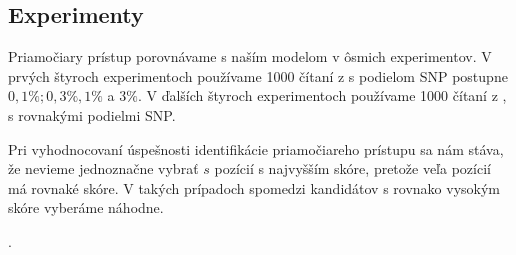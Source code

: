 \subsection{Experimenty}

Priamočiary prístup porovnávame s naším modelom v ôsmich experimentov. V prvých štyroch experimentoch
používame 1000 čítaní z  s podielom SNP postupne $0,1\%; 0,3\%, 1\%$ a $3\%$. V ďalších
štyroch experimentoch používame 1000 čítaní z , s rovnakými podielmi SNP.

Pri vyhodnocovaní úspešnosti identifikácie priamočiareho prístupu sa nám stáva, že nevieme jednoznačne
vybrať $s$ pozícií s najvyšším skóre, pretože veľa pozícií má rovnaké skóre. V takých prípadoch spomedzi
kandidátov s rovnako vysokým skóre vyberáme náhodne.

.